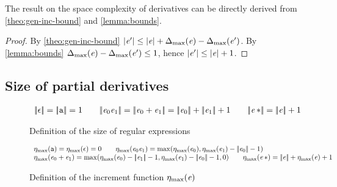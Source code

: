 The result on the space complexity of derivatives can be directly derived from  \cref{theo:gen-inc-bound} and \cref{lemma:bounds}.


\begin{proof}
 By \cref{theo:gen-inc-bound} ${\mid}{\mathit {e}'}{\mid}\leq{\mid}{\ensuremath{\mathit {e}}}{\mid}+{\Delta_{\max}}({\mathit {e}})-{\Delta_{\max}}({\mathit {e}'})$. By \cref{lemma:bounds}
 ${\Delta_{\max}}({\mathit {e}})-{\Delta_{\max}}({\mathit {e}'})\leq 1$, hence
 ${\mid}{\mathit {e}'}{\mid}\leq{\mid}{\ensuremath{\mathit {e}}}{\mid}+1$.
\end{proof}

\subsection{Size of partial derivatives}\label{sec:size}
\begin{figure}
 $$
  \begin{array}{c}
   \tsize{\eps}=\tsize{\sym}=1                                                    \qquad
   \tsize{\re_0\catop\re_1}=\tsize{\re_0\orop\re_1}=\tsize{\re_0}+\tsize{\re_1}+1 \qquad
   \tsize{\starop{\re}}=\tsize{\re}+1
  \end{array}
 $$
 \caption{Definition of the size of regular expressions}
 \label{fig:size}
\end{figure}

\begin{figure}
 $$
  \begin{array}{l}
   \incFunSize{\sym}=\incFunSize{\eps}=0                                      \qquad
   \incFunSize{\re_0\catop\re_1}=\max(\incFunSize{\re_0},\incFunSize{\re_1}-\tsize{\re_0}-1) \\
   \incFunSize{\re_0\orop\re_1}= \max(\incFunSize{\re_0}-\tsize{\re_1}-1,\incFunSize{\re_1}-\tsize{\re_0}-1,0)                                        \qquad
   \incFunSize{\starop{\re}}=\tsize{\re}+\incFunSize{\re}+1
  \end{array}
 $$
 \caption{Definition of the increment function ${\eta_{\max}}({\mathit {e}})$}
 \label{fig:incFunSize}
\end{figure}

